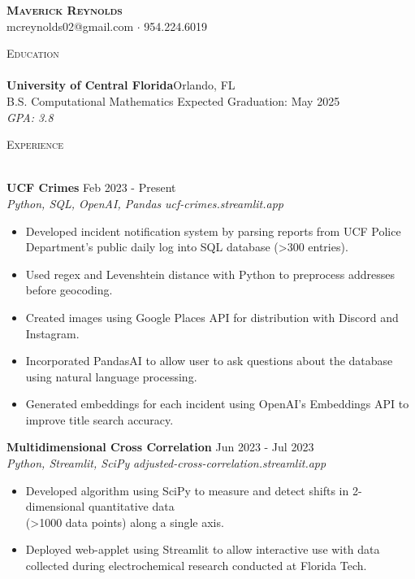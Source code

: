 \documentclass[letterpaper]{article}
\newcommand{\lineunder} {
    \vspace*{-8pt} \\
    \hspace*{-18pt} \hrulefill \\
}
\newcommand{\header} [1] {
    {\hspace*{-18pt}\vspace*{12pt} \large\textsc{#1}}
    \vspace*{-12pt} \lineunder
}
\begin{document}
\vspace*{-25pt}
    

\vspace*{-10pt}
\begin{center}
	{\Huge \scshape \textbf {Maverick Reynolds}}\\
	mcreynolds02@gmail.com $\cdot$ 954.224.6019\\
\end{center}


\header{Education}
\textbf{University of Central Florida}\hfill Orlando, FL\\
B.S. Computational Mathematics \hfill Expected Graduation: May 2025\\
\hspace{7mm} \textit{GPA: 3.8}\\
\vspace{3mm}


\header{Experience}
\vspace{1mm}

\textbf{UCF Crimes} \hfill Feb 2023 - Present \\
\textit{Python, SQL, OpenAI, Pandas} \hfill \textit{ucf-crimes.streamlit.app}\\
\vspace{-1mm}
\begin{itemize} \itemsep 1pt
	\item Developed incident notification system by parsing reports from UCF Police Department's public daily log into SQL database (>300 entries).
	\item Used regex and Levenshtein distance with Python to preprocess addresses before geocoding.
	\item Created images using Google Places API for distribution with Discord and Instagram.
	\item Incorporated PandasAI to allow user to ask questions about the database using natural language processing.
	\item Generated embeddings for each incident using OpenAI's Embeddings API to improve title search accuracy.
\end{itemize}

\textbf{Multidimensional Cross Correlation} \hfill Jun 2023 - Jul 2023 \\
\textit{Python, Streamlit, SciPy} \hfill \textit{adjusted-cross-correlation.streamlit.app}\\
\vspace{-1mm}
\begin{itemize} \itemsep 1pt
	\item Developed algorithm using SciPy to measure and detect shifts in 2-dimensional quantitative data \\ (>1000 data points) along a single axis.
	\item Deployed web-applet using Streamlit to allow interactive use with data collected during electrochemical research conducted at Florida Tech.
\end{itemize}
\end{document}
